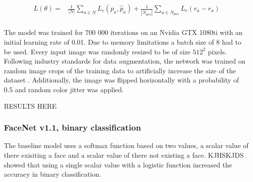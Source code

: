 \documentclass[a4paper, twoside]{article}
\begin{document}
\begin{equation}
\begin{split}
	L(\theta) = &  \frac{1}{|N|} \sum_{a \in N} L_c(p_a, \hat{p}_a) 
	 + \frac{1}{|N_{pos}|} \sum_{a \in N_{pos}} L_r(r_a - \hat{r}_a)  \\ 
\end{split}
\end{equation}

The model was trained for 700 000 iterations on an Nvidia GTX 1080ti with an initial learning rate of 0.01. Due to memory limitations a batch size of 8 had to be used. Every input image was randomly resized to be of size $512^2$ pixels. Following industry standards for data augmentation, the network was trained on random image crops of the training data to artificially increase the size of the dataset \cite{cs231n}. Additionally, the image was flipped horizontally with a probability of 0.5 and random color jitter was applied.




RESULTS HERE

\subsubsection{FaceNet v1.1, binary classification}
The baseline model uses a softmax function based on two values, a scalar value of there exisiting a face and a scalar value of there not existing a face. KJHSKJDS showed that using a single scalar value with a logistic function increased the accuracy in binary classification.
\end{document}
